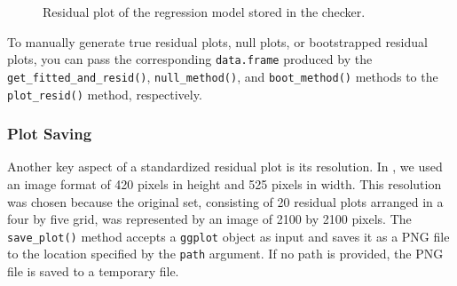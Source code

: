 \documentclass[
doublespace,
  times]{anzsauth}
\newenvironment{Shaded}{\begin{snugshade}}{\end{snugshade}}
\newcommand{\FunctionTok}[1]{\textcolor[rgb]{0.28,0.35,0.67}{#1}}
\newcommand{\NormalTok}[1]{\textcolor[rgb]{0.00,0.23,0.31}{#1}}
\newcommand{\SpecialCharTok}[1]{\textcolor[rgb]{0.37,0.37,0.37}{#1}}
\begin{document}
\begin{Shaded}
\end{Shaded}

\begin{figure}[H]


\caption{\label{fig-autovi-plot-resid}Residual plot of the regression
model stored in the checker.}

\end{figure}%

To manually generate true residual plots, null plots, or bootstrapped
residual plots, you can pass the corresponding \texttt{data.frame}
produced by the \texttt{get\_fitted\_and\_resid()},
\texttt{null\_method()}, and \texttt{boot\_method()} methods to the
\texttt{plot\_resid()} method, respectively.

\subsubsection{Plot Saving}\label{plot-saving}

Another key aspect of a standardized residual plot is its resolution. In
\citet{li2024automated}, we used an image format of 420 pixels in height
and 525 pixels in width. This resolution was chosen because the original
set, consisting of 20 residual plots arranged in a four by five grid,
was represented by an image of 2100 by 2100 pixels. The
\texttt{save\_plot()} method accepts a \texttt{ggplot} object as input
and saves it as a PNG file to the location specified by the
\texttt{path} argument. If no path is provided, the PNG file is saved to
a temporary file.
\end{document}
